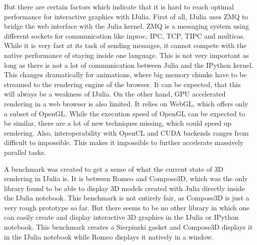 But there are certain factors which indicate that it is hard to reach optimal performance for interactive graphics with IJulia.
First of all, IJulia uses ZMQ to bridge the web interface with the Julia kernel.
ZMQ\cite{ZMQ} is a messaging system using different sockets for communication like inproc, IPC, TCP, TIPC and multicas.
While it is very fast at its task of sending messages, it cannot compete with the native performance of staying inside one language.
This is not very important as long as there is not a lot of communication between Julia and the IPython kernel. This changes dramatically for animations, where big memory chunks have to be streamed to the rendering engine of the browser. It can be expected, that this will always be a weakness of IJulia.
On the other hand, \ac{GPU} accelerated rendering in a web browser is also limited.
It relies on \ac{WebGL}, which offers only a subset of OpenGL. While the execution speed of OpenGL can be expected to be similar, there are a lot of new techniques missing, which could speed up rendering. Also, interoperability with \ac{OpenCL} and \ac{CUDA} backends ranges from difficult to impossible. 
This makes it impossible to further accelerate massively parallel tasks.

A benchmark was created to get a sense of what the current state of 3D rendering in IJulia is.
It is between Romeo and Compose3D\cite{Compose3D}, which was the only library found to be able to display 3D models created with Julia directly inside the IJulia notebook.
This benchmark is not entirely fair, as Compose3D is just a very rough prototype so far. 
But there seems to be no other library in which one can easily create and display interactive 3D graphics in the IJulia or IPython notebook. 
This benchmark creates a Sierpinski gasket and Compose3D displays it in the IJulia notebook while Romeo displays it natively in a window.

